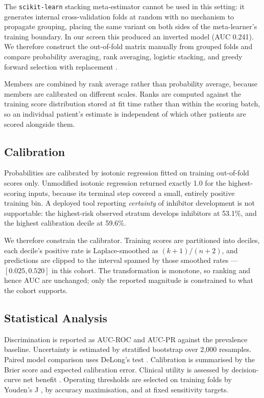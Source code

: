 \documentclass[conference]{IEEEtran}
\begin{document}
The \texttt{scikit-learn} stacking meta-estimator cannot be used in this
setting: it generates internal cross-validation folds at random with no
mechanism to propagate grouping, placing the same variant on both sides of the
meta-learner's training boundary. In our screen this produced an inverted model
(AUC 0.241). We therefore construct the out-of-fold matrix manually from
grouped folds and compare probability averaging, rank averaging, logistic
stacking, and greedy forward selection with replacement \cite{caruana}.

Members are combined by rank average rather than probability average, because
members are calibrated on different scales. Ranks are computed against the
training score distribution stored at fit time rather than within the scoring
batch, so an individual patient's estimate is independent of which other
patients are scored alongside them.

\subsection{Calibration}
Probabilities are calibrated by isotonic regression \cite{isotonic} fitted on
training out-of-fold scores only. Unmodified isotonic regression returned
exactly 1.0 for the highest-scoring inputs, because its terminal step covered a
small, entirely positive training bin. A deployed tool reporting
\textit{certainty} of inhibitor development is not supportable: the
highest-risk observed stratum develops inhibitors at 53.1\%, and the highest
calibration decile at 59.6\%.

We therefore constrain the calibrator. Training scores are partitioned into
deciles, each decile's positive rate is Laplace-smoothed as $(k+1)/(n+2)$, and
predictions are clipped to the interval spanned by those smoothed rates ---
$[0.025, 0.520]$ in this cohort. The transformation is monotone, so ranking and
hence AUC are unchanged; only the reported magnitude is constrained to what the
cohort supports.

\subsection{Statistical Analysis}
Discrimination is reported as AUC-ROC and AUC-PR against the prevalence
baseline. Uncertainty is estimated by stratified bootstrap over 2{,}000
resamples. Paired model comparison uses DeLong's test \cite{delong}.
Calibration is summarised by the Brier score and expected calibration error.
Clinical utility is assessed by decision-curve net benefit \cite{dca}.
Operating thresholds are selected on training folds by Youden's J
\cite{youden}, by accuracy maximisation, and at fixed sensitivity targets.
\end{document}
